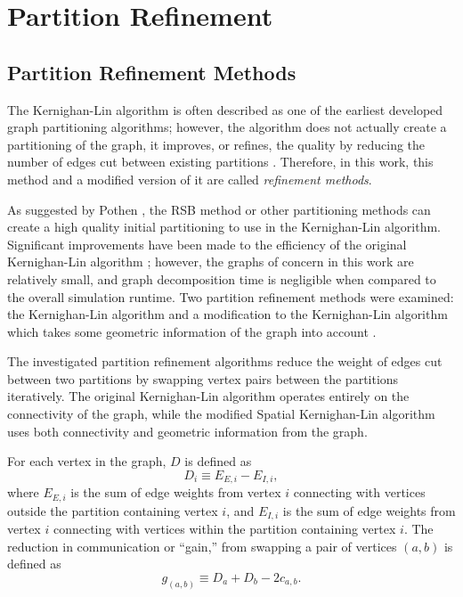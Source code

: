 {  \section{Partition Refinement}{\label{sec:Spatial Decomposition:Partition Refinement}
    \subsection{Partition Refinement Methods}{\label{ssec:Spatial Decomposition:Partition Refinement Methods}
      The Kernighan-Lin algorithm \cite{Kernighan1970} is often described as one of the earliest developed graph partitioning algorithms; however, the algorithm does not actually create a partitioning of the graph, it improves, or refines, the quality by reducing the number of edges cut between existing partitions \cite{Elsner1997}.
      Therefore, in this work, this method and a modified version of it are called \emph{refinement methods}.

      As suggested by Pothen \cite{Pothen1989}, the \ac{RSB} method or other partitioning methods can create a high quality initial partitioning to use in the Kernighan-Lin algorithm.
      Significant improvements have been made to the efficiency of the original Kernighan-Lin algorithm \cite{Fiduccia1982}; however, the graphs of concern in this work are relatively small, and graph decomposition time is negligible when compared to the overall simulation runtime.
      Two partition refinement methods were examined: the Kernighan-Lin algorithm \cite{Kernighan1970} and a modification to the Kernighan-Lin algorithm which takes some geometric information of the graph into account \cite{Fitzgerald2017}.

      The investigated partition refinement algorithms reduce the weight of edges cut between two partitions by swapping vertex pairs between the partitions iteratively.
      The original Kernighan-Lin algorithm operates entirely on the connectivity of the graph, while the modified Spatial Kernighan-Lin algorithm uses both connectivity and geometric information from the graph.

      For each vertex in the graph, $D$ is defined as
      \begin{equation}
          \label{eq:Spatial Decomposition:KL D}
          D_i \equiv E_{E,i} - E_{I,i},
      \end{equation}
      where $E_{E,i}$ is the sum of edge weights from vertex $i$ connecting with vertices outside the partition containing vertex $i$, and $E_{I,i}$ is the sum of edge weights from vertex $i$ connecting with vertices within the partition containing vertex $i$.
      The reduction in communication or ``gain,'' from swapping a pair of vertices $(a,b)$ is defined as
      \begin{equation}
          \label{eq:Spatial Decomposition:KL gain}
          g_{(a,b)} \equiv D_a + D_b - 2c_{a,b}.
      \end{equation}

}}}
